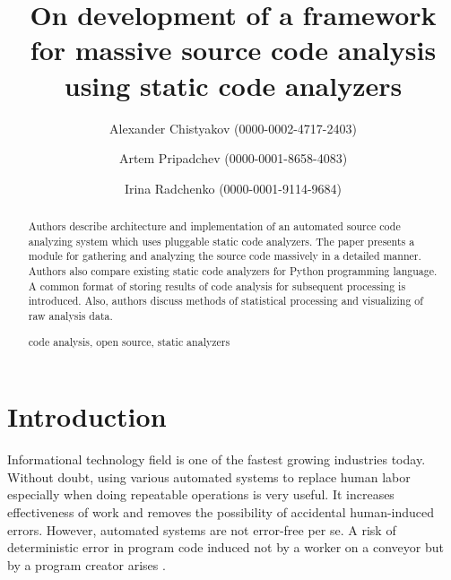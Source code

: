 \documentclass[runningheads,a4paper]{llncs}
\newcommand{\keywords}[1]{\par\addvspace\baselineskip
\noindent\keywordname\enspace\ignorespaces#1}
\begin{document}
\mainmatter  %

\title{On development of a framework\\for massive source code analysis\\
using static code analyzers}


\author{Alexander Chistyakov (0000-0002-4717-2403)
\and Artem Pripadchev (0000-0001-8658-4083)\and Irina Radchenko (0000-0001-9114-9684)}
%


\maketitle


\begin{abstract}
  Authors describe architecture and implementation of an automated source code
  analyzing system which uses pluggable static code analyzers. The paper
  presents a module for gathering and analyzing the source code massively in a detailed manner.
  Authors also compare existing static code analyzers for Python programming
  language. A common format of storing results of code analysis for subsequent
  processing is introduced. Also, authors discuss methods of statistical
  processing and visualizing of raw analysis data.
\keywords{code analysis, open source, static analyzers}
\end{abstract}


\section{Introduction}

Informational technology field is one of the fastest growing industries today.
Without doubt, using various automated systems to replace human labor especially
when doing repeatable operations is very useful. It increases effectiveness
of work and removes the possibility of accidental human-induced errors.
However, automated systems are not error-free per se. A risk of deterministic
error in program code induced not by a worker on a conveyor but by
a program creator arises \cite{item01}.
\end{document}
